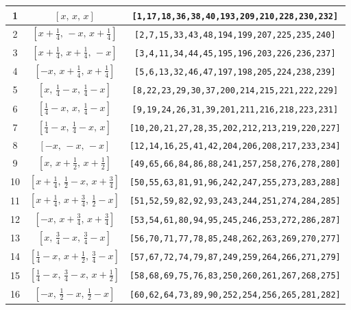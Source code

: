 \documentclass[fleqn,8pt]{jsarticle}
\begin{document}
\begin{longtable}{ccc}
1 & $\left[ x,\, x,\, x \right]$ & {\tt [1,17,18,36,38,40,193,209,210,228,230,232]} \\ \hline
2 & $\left[ x + \frac{1}{4},\, - x,\, x + \frac{1}{4} \right]$ & {\tt [2,7,15,33,43,48,194,199,207,225,235,240]} \\ \hline
3 & $\left[ x + \frac{1}{4},\, x + \frac{1}{4},\, - x \right]$ & {\tt [3,4,11,34,44,45,195,196,203,226,236,237]} \\ \hline
4 & $\left[ - x,\, x + \frac{1}{4},\, x + \frac{1}{4} \right]$ & {\tt [5,6,13,32,46,47,197,198,205,224,238,239]} \\ \hline
5 & $\left[ x,\, \frac{1}{4} - x,\, \frac{1}{4} - x \right]$ & {\tt [8,22,23,29,30,37,200,214,215,221,222,229]} \\ \hline
6 & $\left[ \frac{1}{4} - x,\, x,\, \frac{1}{4} - x \right]$ & {\tt [9,19,24,26,31,39,201,211,216,218,223,231]} \\ \hline
7 & $\left[ \frac{1}{4} - x,\, \frac{1}{4} - x,\, x \right]$ & {\tt [10,20,21,27,28,35,202,212,213,219,220,227]} \\ \hline
8 & $\left[ - x,\, - x,\, - x \right]$ & {\tt [12,14,16,25,41,42,204,206,208,217,233,234]} \\ \hline
9 & $\left[ x,\, x + \frac{1}{2},\, x + \frac{1}{2} \right]$ & {\tt [49,65,66,84,86,88,241,257,258,276,278,280]} \\ \hline
10 & $\left[ x + \frac{1}{4},\, \frac{1}{2} - x,\, x + \frac{3}{4} \right]$ & {\tt [50,55,63,81,91,96,242,247,255,273,283,288]} \\ \hline
11 & $\left[ x + \frac{1}{4},\, x + \frac{3}{4},\, \frac{1}{2} - x \right]$ & {\tt [51,52,59,82,92,93,243,244,251,274,284,285]} \\ \hline
12 & $\left[ - x,\, x + \frac{3}{4},\, x + \frac{3}{4} \right]$ & {\tt [53,54,61,80,94,95,245,246,253,272,286,287]} \\ \hline
13 & $\left[ x,\, \frac{3}{4} - x,\, \frac{3}{4} - x \right]$ & {\tt [56,70,71,77,78,85,248,262,263,269,270,277]} \\ \hline
14 & $\left[ \frac{1}{4} - x,\, x + \frac{1}{2},\, \frac{3}{4} - x \right]$ & {\tt [57,67,72,74,79,87,249,259,264,266,271,279]} \\ \hline
15 & $\left[ \frac{1}{4} - x,\, \frac{3}{4} - x,\, x + \frac{1}{2} \right]$ & {\tt [58,68,69,75,76,83,250,260,261,267,268,275]} \\ \hline
16 & $\left[ - x,\, \frac{1}{2} - x,\, \frac{1}{2} - x \right]$ & {\tt [60,62,64,73,89,90,252,254,256,265,281,282]} \\ \hline

\end{longtable}
\end{document}
